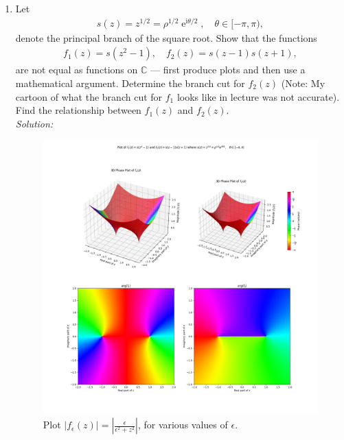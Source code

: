 \documentclass[10pt]{amsart}
\newcommand{\I}{\mathrm{i}}
\DeclareMathOperator{\E}{e}
\theoremstyle{nonumberplain}
\begin{document}
\begin{enumerate}[label={\bf {\arabic*}:}]
\item Let
  \begin{align*}
    s(z) = z^{1/2} = \rho^{1/2} \E^{\I \theta/2}, \quad \theta \in [-\pi,\pi),
  \end{align*}
  denote the principal branch of the square root.  Show that the
  functions
  \begin{align*}
    f_1(z) = s(z^2 -1), \quad f_2(z) = s(z-1) s(z+1),
  \end{align*}
  are not equal as functions on $\mathbb C$ --- first produce plots and then use a mathematical argument.  Determine the branch cut for $f_2(z)$ (Note: My
  cartoon of what the branch cut for $f_1$ looks like in lecture was
  not accurate).  Find the relationship between $f_1(z)$ and $f_2(z)$.\\
\textit{Solution:} \\
\begin{figure}[h]
	\centering
	\includegraphics[width=1\textwidth]{problem_4_vis.png}
 	\caption{Plot $\left|f_\epsilon(z)\right| = \left| \frac{\epsilon}{\epsilon^2+z^2}\right|$, for various values of $\epsilon$.}\label{fig:f1}
\end{figure}


\end{enumerate}
\end{document}
